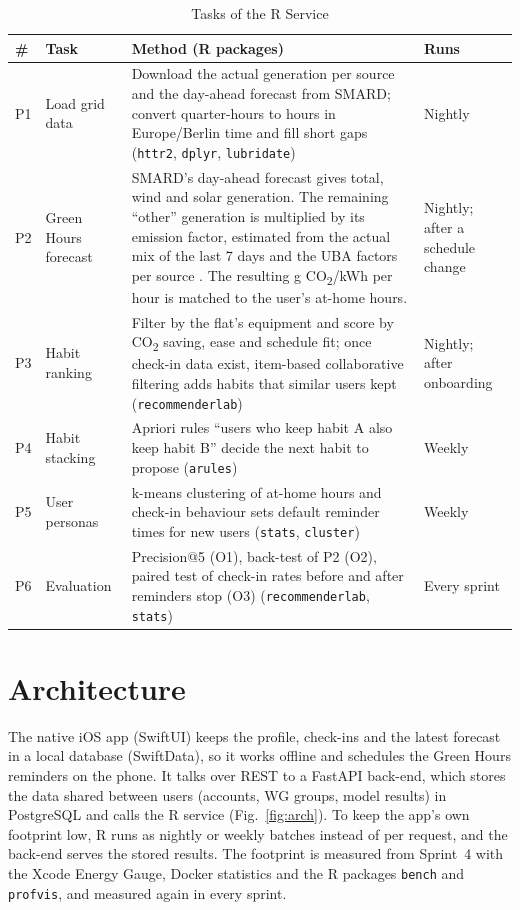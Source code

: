 \documentclass[10pt,twocolumn,letterpaper]{article}
\newcommand{\cotwo}{CO\textsubscript{2}}
\newcommand{\code}[1]{\texttt{#1}}
\begin{document}
\begin{table}[t]
\caption{Tasks of the R Service}\label{tab:r}
\footnotesize
\begin{tabularx}{\textwidth}{@{}p{0.5cm}>{\raggedright\arraybackslash}p{2.5cm}L>{\raggedright\arraybackslash}p{2.0cm}@{}}
\toprule
\# & Task & Method (R packages) & Runs \\
\midrule
P1 & Load grid data & Download the actual generation per source and the day-ahead forecast from SMARD; convert quarter-hours to hours in Europe/Berlin time and fill short gaps (\code{httr2}, \code{dplyr}, \code{lubridate}) & Nightly \\
P2 & Green Hours forecast & SMARD's day-ahead forecast gives total, wind and solar generation. The remaining ``other'' generation is multiplied by its emission factor, estimated from the actual mix of the last 7 days and the UBA factors per source \cite{uba_ef}. The resulting g \cotwo/kWh per hour is matched to the user's at-home hours. & Nightly; after a schedule change \\
P3 & Habit ranking & Filter by the flat's equipment and score by \cotwo{} saving, ease and schedule fit; once check-in data exist, item-based collaborative filtering adds habits that similar users kept (\code{recommenderlab}) & Nightly; after onboarding \\
P4 & Habit stacking & Apriori rules ``users who keep habit A also keep habit B'' decide the next habit to propose (\code{arules}) & Weekly \\
P5 & User personas & k-means clustering of at-home hours and check-in behaviour sets default reminder times for new users (\code{stats}, \code{cluster}) & Weekly \\
P6 & Evaluation & Precision@5 (O1), back-test of P2 (O2), paired test of check-in rates before and after reminders stop (O3) (\code{recommenderlab}, \code{stats}) & Every sprint \\
\bottomrule
\end{tabularx}
\end{table}
 
\section{Architecture}
The native iOS app (SwiftUI) keeps the profile, check-ins and the latest forecast in a local database (SwiftData), so it works offline and schedules the Green Hours reminders on the phone. It talks over REST to a FastAPI back-end, which stores the data shared between users (accounts, WG groups, model results) in PostgreSQL and calls the R service (Fig.~\ref{fig:arch}). To keep the app's own footprint low, R runs as nightly or weekly batches instead of per request, and the back-end serves the stored results. The footprint is measured from Sprint~4 with the Xcode Energy Gauge, Docker statistics and the R packages \code{bench} and \code{profvis}, and measured again in every sprint.
 
\end{document}
